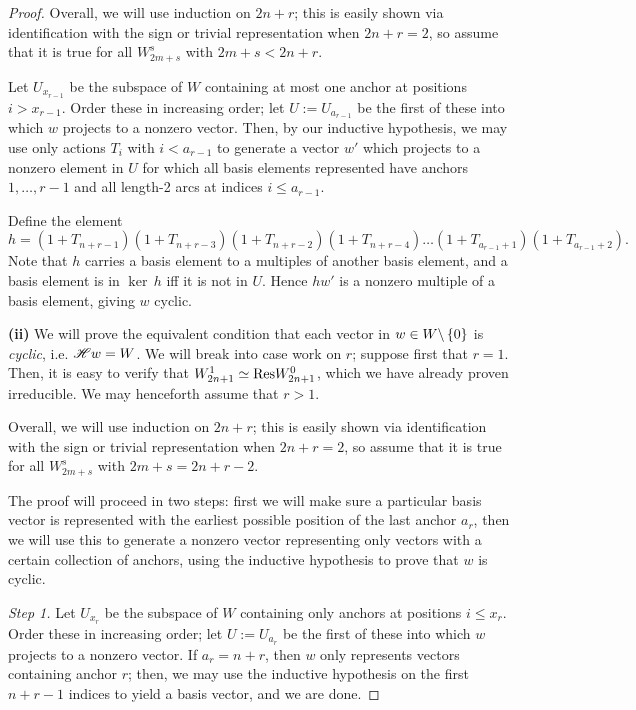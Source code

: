\documentclass{amsart}
\begin{document}
\begin{proof}
  Overall, we will use induction on $2n + r$;
  this is easily shown via identification with the sign or trivial representation when $2n + r = 2$, so assume that it is true for all $W_{2m + s}^s$ with $2m + s < 2n + r$.

  Let $U_{x_{r-1}}$ be the subspace of $W$ containing at most one anchor at positions $i > x_{r-1}$.
  Order these in increasing order;
  let $U := U_{a_{r-1}}$ be the first of these into which $w$ projects to a nonzero vector.
  Then, by our inductive hypothesis, we may use only actions $T_i$ with $i < a_{r-1}$ to generate a vector $w'$ which projects to a nonzero element in $U$ for which all basis elements represented have anchors $1,\dots,r-1$ and all length-2 arcs at indices $i \leq a_{r-1}$.

  Define the element
  \[
    h = (1 + T_{n + r - 1})(1 + T_{n+r-3})(1 + T_{n+r-2})(1 + T_{n + r - 4})\dots(1 + T_{a_{r-1} +1})(1 + T_{a_{r-1}+2}).
  \]
  Note that $h$ carries a basis element to a multiples of another basis element, and a basis element is in $\ker \, h$ iff it is not in $U$.
  Hence $hw'$ is a nonzero multiple of a basis element, giving $w$ cyclic.
  \fi

  \vspace{\sectionsep}
  \textbf{(ii)}
  We will prove the equivalent condition that each vector in $w \in W\backslash \left\{ 0 \right\}$ is \emph{cyclic}, i.e. $\mathscr{H} w = W$.
  We will break into case work on $r$;
  suppose first that $r = 1$.
  Then, it is easy to verify that $W_{2n + 1}^1 \simeq \text{Res} W_{2n + 1}^0$, which we have already proven irreducible.
  We may henceforth assume that $r > 1$.
  
  Overall, we will use induction on $2n + r$;
  this is easily shown via identification with the sign or trivial representation when $2n + r = 2$, so assume that it is true for all $W_{2m + s}^s$ with $2m + s = 2n + r - 2$.
  
  The proof will proceed in two steps: first we will make sure a particular basis vector is represented with the earliest possible position of the last anchor $a_r$, then we will use this to generate a nonzero vector representing only vectors with a certain collection of anchors, using the inductive hypothesis to prove that $w$ is cyclic.
  
  \vspace{\sectionsep}
  \textit{Step 1.}
  Let $U_{x_r}$ be the subspace of $W$ containing only anchors at positions $i \leq x_r$.
  Order these in increasing order;
  let $U := U_{a_r}$ be the first of these into which $w$ projects to a nonzero vector.
  If $a_r = n + r$, then $w$ only represents vectors containing anchor $r$;
  then, we may use the inductive hypothesis on the first $n + r - 1$ indices to yield a basis vector, and we are done.


\end{proof}
\end{document}

